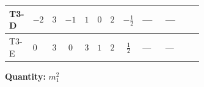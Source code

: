\documentclass[8pt]{article}
\begin{document}
\begin{landscape}
\begin{longtable}{@{}llcccccc >{\raggedright\arraybackslash}p{0.21\linewidth} >{\raggedright\arraybackslash}p{0.21\linewidth} >{\raggedright\arraybackslash}p{0.21\linewidth}@{}}
\midrule
T3-D & $-2$ & $3$ & $-1$ & $1$ & $0$ & $2$ & $-\frac{1}{2}$ & --- & --- & \scriptsize\adjustbox{max width=\linewidth}{$\begin{gathered} -4 \operatorname{Tr}\!\left({M_F}\,\left({M_F}\right)^{\dagger}\,\left({y_1}\right)^{T}\,\left({y_1}\right)^{*}\right)\end{gathered}$} \\
\midrule
T3-E & $0$ & $3$ & $0$ & $3$ & $1$ & $2$ & $\frac{1}{2}$ & --- & --- & \scriptsize\adjustbox{max width=\linewidth}{$\begin{gathered} -4 \operatorname{Tr}\!\left({M_F}\,\left({M_F}\right)^{\dagger}\,\left({y_1}\right)^{T}\,\left({y_1}\right)^{*}\right)\end{gathered}$} \\
\midrule
\bottomrule
\end{longtable}
\clearpage
\noindent\textbf{Quantity: }$m_1^2$\par\smallskip

\end{landscape}
\end{document}
